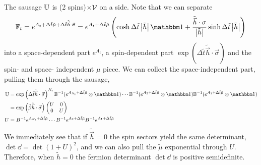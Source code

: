 The sausage $\mathbb{U}$ is (2 spins)$\times \mathcal{V}$ on a side.
Note that we can separate
\begin{align} 
	\FF_t 
	= e^{A_{t}+\Delta\tilde{t}\tilde{\mu} + \Delta\tilde{t}\tilde{\vec{h}}\cdot\vec{\sigma}}
	= e^{A_t + \Delta\tilde{t}\tilde{\mu}}\left( \cosh \Delta\tilde{t} \abs{\tilde{h}} \one + \frac{\tilde{\vec{h}}\cdot \sigma}{\abs{\tilde{h}}}\sinh \Delta\tilde{t} \abs{\tilde{h}} \right)
	\label{eq:FF explicitly}
\end{align}
into a space-dependent part $e^{A_t}$, a spin-dependent part $\exp( \Delta\tilde{t}\tilde{\vec{h}} \cdot \vec{\sigma})$ and the spin- and space- independent $\mu$ piece.
We can collect the space-independent part, pulling them through the sausage,
\begin{align}
	\UU 
	&= \exp\left(\Delta\tilde{t} \tilde{\vec{h}}\cdot\vec{\sigma}\right)^{N_t} \BB\inverse (e^{A_{N_t} + \Delta\tilde{t}\tilde{\mu}} \otimes\one)\cdots \BB\inverse (e^{A_2 + \Delta\tilde{t}\tilde{\mu}}\otimes\one) \BB\inverse (e^{A_1 + \Delta\tilde{t}\tilde{\mu}}\otimes \one)
	\\
	&= \exp\left(\tilde{\beta}\tilde{\vec{h}}\cdot\vec{\sigma}\right) \begin{pmatrix} U & 0 \\ 0 & U \end{pmatrix}
	\\
	U &= B\inverse e^{A_{N_t} + \Delta\tilde{t}\tilde{\mu}} \cdots B\inverse e^{A_2 + \Delta\tilde{t}\tilde{\mu}} B\inverse e^{A_1 + \Delta\tilde{t}\tilde{\mu}}
\end{align}
We immediately see that if $\tilde{\vec{h}} = 0$ the spin sectors yield the same determinant, $\det\dd = \det (1+U)^2$, and we can also pull the $\tilde{\mu}$ exponential through $U$.
Therefore, when $\tilde{h}=0$ the fermion determinant $\det\dd$ is positive semidefinite.

